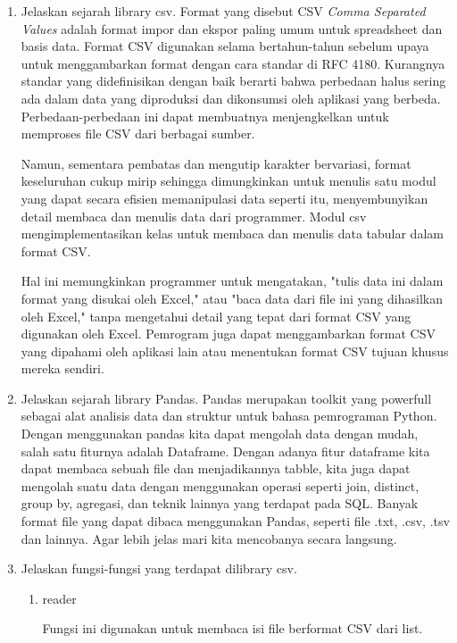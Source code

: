 \begin{enumerate}
   \item Jelaskan sejarah library csv.
   Format yang disebut CSV \textit{Comma Separated Values} adalah format impor dan ekspor paling umum untuk spreadsheet dan basis data. Format CSV digunakan selama bertahun-tahun sebelum upaya untuk menggambarkan format dengan cara standar di RFC 4180. Kurangnya standar yang didefinisikan dengan baik berarti bahwa perbedaan halus sering ada dalam data yang diproduksi dan dikonsumsi oleh aplikasi yang berbeda. Perbedaan-perbedaan ini dapat membuatnya menjengkelkan untuk memproses file CSV dari berbagai sumber.

   Namun, sementara pembatas dan mengutip karakter bervariasi, format keseluruhan cukup mirip sehingga dimungkinkan untuk menulis satu modul yang dapat secara efisien memanipulasi data seperti itu, menyembunyikan detail membaca dan menulis data dari programmer. Modul csv mengimplementasikan kelas untuk membaca dan menulis data tabular dalam format CSV.

   Hal ini memungkinkan programmer untuk mengatakan, "tulis data ini dalam format yang disukai oleh Excel," atau "baca data dari file ini yang dihasilkan oleh Excel," tanpa mengetahui detail yang tepat dari format CSV yang digunakan oleh Excel. Pemrogram juga dapat menggambarkan format CSV yang dipahami oleh aplikasi lain atau menentukan format CSV tujuan khusus mereka sendiri.

   \item Jelaskan sejarah library Pandas.
   Pandas merupakan toolkit yang powerfull sebagai alat analisis data dan struktur untuk bahasa pemrograman Python. Dengan menggunakan pandas kita dapat mengolah data dengan mudah, salah satu fiturnya adalah Dataframe. Dengan adanya fitur dataframe kita dapat membaca sebuah file dan menjadikannya tabble, kita juga dapat mengolah suatu data dengan menggunakan operasi seperti join, distinct, group by, agregasi, dan teknik lainnya yang terdapat pada SQL. Banyak format file yang dapat dibaca menggunakan Pandas, seperti file .txt, .csv, .tsv dan lainnya. Agar lebih jelas mari kita mencobanya secara langsung.

   \item Jelaskan fungsi-fungsi yang terdapat dilibrary csv.
       \begin{enumerate}
		\item reader
		
		Fungsi ini digunakan untuk membaca isi file berformat CSV dari list.
		
		
		

\end{enumerate}
\end{enumerate}
